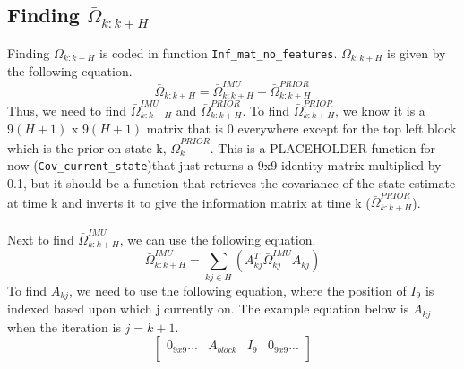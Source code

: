 \documentclass{article}
\begin{document}
\subsection{Finding $\bar{\Omega}_{k:k+H}$}
Finding $\bar{\Omega}_{k:k+H}$ is coded in function \texttt{Inf\_mat\_no\_features}. $\bar{\Omega}_{k:k+H}$ is given by the following equation.
\begin{equation}
    \bar{\Omega}_{k:k+H} = \bar{\Omega}_{k:k+H}^{IMU} + \bar{\Omega}_{k:k+H}^{PRIOR}
    \label{eq:omega_IMU}
\end{equation}
Thus, we need to find $\bar{\Omega}_{k:k+H}^{IMU}$ and $\bar{\Omega}_{k:k+H}^{PRIOR}$. To find $\bar{\Omega}_{k:k+H}^{PRIOR}$, we know it is a $9(H+1)$ x $9(H+1)$ matrix that is 0 everywhere except for the top left block which is the prior on state k, $\bar{\Omega}_{k}^{PRIOR}$. This is a PLACEHOLDER function for now (\texttt{Cov\_current\_state})that just returns a 9x9 identity matrix multiplied by 0.1, but it should be a function that retrieves the covariance of the state estimate at time k and inverts it to give the information matrix at time k ($\bar{\Omega}_{k:k+H}^{PRIOR}$). \\ \\
Next to find $\bar{\Omega}_{k:k+H}^{IMU}$, we can use the following equation.
\begin{equation}
    \bar{\Omega}_{k:k+H}^{IMU} = \sum_{kj \in H} (A^T_{kj}\bar{\Omega}_{kj}^{IMU}A_{kj})
\end{equation}
To find $A_{kj}$, we need to use the following equation, where the position of $I_9$ is indexed based upon which j currently on. The example equation below is $A_{kj}$ when the iteration is $j = k + 1$.
\[
\begin{bmatrix}
    0_{9x9} ... & A_{block} & I_9 & 0_{9x9} ... \\
\end{bmatrix}\]
\end{document}
